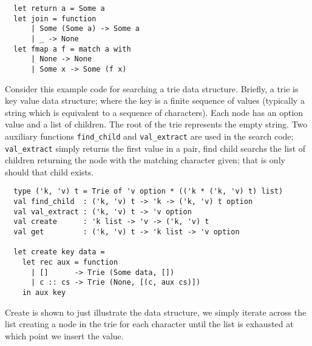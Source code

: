 \begin{verbatim}
  let return a = Some a
  let join = function
      | Some (Some a) -> Some a
      | _ -> None
  let fmap a f = match a with
      | None -> None
      | Some x -> Some (f x)
\end{verbatim}

Consider this example code for searching a trie data structure.
Briefly, a trie is key value data structure;
where the key is a finite sequence of values
(typically a string which is equivalent to a sequence of characters).
Each node has an option value and a list of children.
The root of the trie represents the empty string.
Two auxiliary functions \texttt{find\_child} and \texttt{val\_extract}
are used in the search code; \texttt{val\_extract}
simply returns the first value in a pair,
find child searchs the list of children returning
the node with the matching character given;
that is only should that child exists.

\begin{verbatim}
  type ('k, 'v) t = Trie of 'v option * (('k * ('k, 'v) t) list)
  val find_child  : ('k, 'v) t -> 'k -> ('k, 'v) t option
  val val_extract : ('k, 'v) t -> 'v option
  val create      : 'k list -> 'v -> ('k, 'v) t
  val get         : ('k, 'v) t -> 'k list -> 'v option

  let create key data =
    let rec aux = function
      | []      -> Trie (Some data, [])
      | c :: cs -> Trie (None, [(c, aux cs)])
    in aux key
\end{verbatim}

Create is shown to just illustrate the data structure,
we simply iterate across the list creating a node in the trie for each character
until the list is exhausted at which point we insert the value.

\begin{center}
\end{center}


